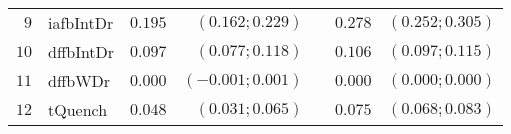 \begin{table*}[!ht]
\begin{tabular*}{\textwidth}{@{}rlrrrrr@{}}
\footnotesize{$9 $} & \footnotesize{iafbIntDr} & \footnotesize{$0.195$} & \footnotesize{$(0.162;0.229)$}  && \footnotesize{$0.278$} & \footnotesize{$(0.252;0.305)$} \\
\footnotesize{$10$} & \footnotesize{dffbIntDr} & \footnotesize{$0.097$} & \footnotesize{$(0.077;0.118)$}  && \footnotesize{$0.106$} & \footnotesize{$(0.097;0.115)$} \\
\footnotesize{$11$} & \footnotesize{dffbWDr  } & \footnotesize{$0.000$} & \footnotesize{$(-0.001;0.001)$} && \footnotesize{$0.000$} & \footnotesize{$(0.000;0.000)$} \\
\footnotesize{$12$} & \footnotesize{tQuench  } & \footnotesize{$0.048$} & \footnotesize{$(0.031;0.065)$}  && \footnotesize{$0.075$} & \footnotesize{$(0.068;0.083)$} \\

\bottomrule
\end{tabular*}
\end{table*}

